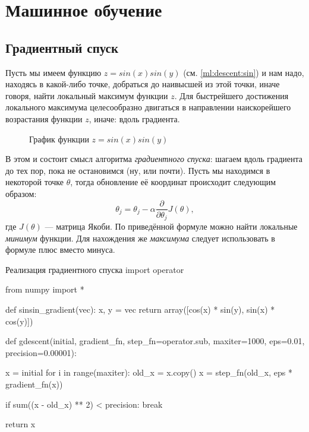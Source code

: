 \chapter{Машинное обучение}
\label{ch:ml}

\section{Градиентный спуск}
Пусть мы имеем функцию $z = sin(x)sin(y)$ (см. \autoref{ml:descent:sin}) и нам надо, находясь в какой-либо точке, добраться до наивысшей из этой точки, иначе говоря, найти локальный максимум функции $z$. Для быстрейшего достижения локального максимума целесообразно двигаться в направлении наискорейшего возрастания функции $z$, иначе: вдоль градиента.

\IfNotDraft
{
\begin{figure}[htb]
  \centering
  \caption{График функции $z = sin(x)sin(y)$}
  \label{ml:descent:sin}
\end{figure}
}

В этом и состоит смысл алгоритма \emph{градиентного спуска}: шагаем вдоль градиента до тех пор, пока не остановимся (ну, или почти). Пусть мы находимся в некоторой точке $\theta$, тогда обновление её координат происходит следующим образом:
\[
\theta_j = \theta_j - \alpha\frac{\partial}{\partial\theta_j}J(\theta),
\]
где $J(\theta)$ — матрица Якоби. По приведённой формуле можно найти локальные \emph{минимум} функции. Для нахождения же \emph{максимума} следует использовать в формуле плюс вместо минуса.

\begin{pylst}{Реализация градиентного спуска}{}
import operator

from numpy import *

def sinsin_gradient(vec):
    x, y = vec
    return array([cos(x) * sin(y),
                  sin(x) * cos(y)])

def gdescent(initial, gradient_fn, step_fn=operator.sub,
             maxiter=1000, eps=0.01, precision=0.00001):

    x = initial
    for i in range(maxiter):
        old_x = x.copy()
        x = step_fn(old_x, eps * gradient_fn(x))

        if sum((x - old_x) ** 2) < precision:
            break

    return x
\end{pylst}

